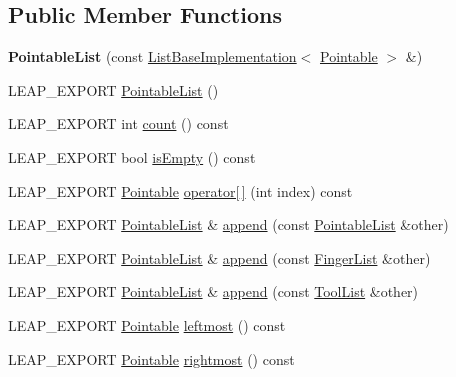 \subsection*{Public Member Functions}
\begin{DoxyCompactItemize}
\item 
\mbox{\label{class_leap_1_1_pointable_list_afeeb15c12648df910dbd27c120b4b649}} 
{\bfseries Pointable\+List} (const \hyperlink{class_leap_1_1_list_base_implementation}{List\+Base\+Implementation}$<$ \hyperlink{class_leap_1_1_pointable}{Pointable} $>$ \&)
\item 
L\+E\+A\+P\+\_\+\+E\+X\+P\+O\+RT \hyperlink{class_leap_1_1_pointable_list_ad8ba234f2a9491dd9c1062432e40ebf5}{Pointable\+List} ()
\item 
L\+E\+A\+P\+\_\+\+E\+X\+P\+O\+RT int \hyperlink{class_leap_1_1_pointable_list_a639d7f8ad33281f4a6c6c822416b90fc}{count} () const
\item 
L\+E\+A\+P\+\_\+\+E\+X\+P\+O\+RT bool \hyperlink{class_leap_1_1_pointable_list_a42ea882e4e9562e59c75604d6a2ca64a}{is\+Empty} () const
\item 
L\+E\+A\+P\+\_\+\+E\+X\+P\+O\+RT \hyperlink{class_leap_1_1_pointable}{Pointable} \hyperlink{class_leap_1_1_pointable_list_a9f5818d81e32a028dfb2ea9e593a26c7}{operator\mbox{[}$\,$\mbox{]}} (int index) const
\item 
L\+E\+A\+P\+\_\+\+E\+X\+P\+O\+RT \hyperlink{class_leap_1_1_pointable_list}{Pointable\+List} \& \hyperlink{class_leap_1_1_pointable_list_a415fee35b60e79f69a440096d6818d75}{append} (const \hyperlink{class_leap_1_1_pointable_list}{Pointable\+List} \&other)
\item 
L\+E\+A\+P\+\_\+\+E\+X\+P\+O\+RT \hyperlink{class_leap_1_1_pointable_list}{Pointable\+List} \& \hyperlink{class_leap_1_1_pointable_list_a8da39b0c202e3ade7aad666dcceddfdf}{append} (const \hyperlink{class_leap_1_1_finger_list}{Finger\+List} \&other)
\item 
L\+E\+A\+P\+\_\+\+E\+X\+P\+O\+RT \hyperlink{class_leap_1_1_pointable_list}{Pointable\+List} \& \hyperlink{class_leap_1_1_pointable_list_a091f0c1a7030f5f91701dd54f73a98de}{append} (const \hyperlink{class_leap_1_1_tool_list}{Tool\+List} \&other)
\item 
L\+E\+A\+P\+\_\+\+E\+X\+P\+O\+RT \hyperlink{class_leap_1_1_pointable}{Pointable} \hyperlink{class_leap_1_1_pointable_list_a1f3565cc31a527a850eda34a5f2446c3}{leftmost} () const
\item 
L\+E\+A\+P\+\_\+\+E\+X\+P\+O\+RT \hyperlink{class_leap_1_1_pointable}{Pointable} \hyperlink{class_leap_1_1_pointable_list_ab16ac6f909711f5390ac267d4962be90}{rightmost} () const

\end{DoxyCompactItemize}
